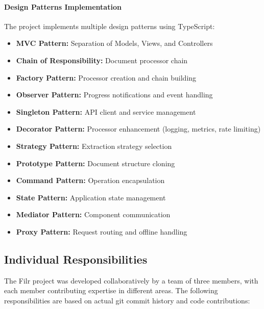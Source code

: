 \documentclass[11pt, a4paper]{article}
\theoremstyle{plain}
\theoremstyle{definition}
\begin{document}
\paragraph{Design Patterns Implementation}
The project implements multiple design patterns using TypeScript:
\begin{itemize}
    \item \textbf{MVC Pattern:} Separation of Models, Views, and Controllers
    \item \textbf{Chain of Responsibility:} Document processor chain
    \item \textbf{Factory Pattern:} Processor creation and chain building
    \item \textbf{Observer Pattern:} Progress notifications and event handling
    \item \textbf{Singleton Pattern:} API client and service management
    \item \textbf{Decorator Pattern:} Processor enhancement (logging, metrics, rate limiting)
    \item \textbf{Strategy Pattern:} Extraction strategy selection
    \item \textbf{Prototype Pattern:} Document structure cloning
    \item \textbf{Command Pattern:} Operation encapsulation
    \item \textbf{State Pattern:} Application state management
    \item \textbf{Mediator Pattern:} Component communication
    \item \textbf{Proxy Pattern:} Request routing and offline handling
\end{itemize}

\subsection{Individual Responsibilities}

The Filr project was developed collaboratively by a team of three members, with each member contributing expertise in different areas. The following responsibilities are based on actual git commit history and code contributions:
\end{document}
